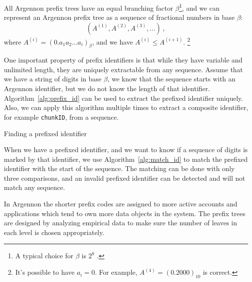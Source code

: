 All Argennon prefix trees have an equal branching factor \(\beta\)\footnote{A typical choice for \(\beta\) is \(2^8\)
    .}, and
we can represent an Argennon
prefix tree as a sequence of fractional numbers in base \(\beta\):
\[
    (A^{(1)},A^{(2)},A^{(3)},\dots)\ ,
\]
where \(A^{(i)}=(0.a_{1}a_{2}\dots a_{i})_\beta\), and we have \(A^{(i)} \leq A^{(i+1)}\). \footnote{It's possible to
have \(a_i=0\). For example, \(A^{(4)}=(0.2000)_{10}\) is correct.}

One important property of prefix identifiers is that while they have variable and unlimited length, they are
uniquely extractable from any sequence. Assume that we have a string of digits in base $\beta$, we
know that the sequence starts with an Argennon identifier, but we do not know the length of that identifier.
Algorithm~\ref{alg:prefix_id} can be used to extract the prefixed identifier uniquely. Also, we can apply this algorithm
multiple times to extract a composite identifier, for example \texttt{chunkID}, from a sequence.

\begin{algorithm}[t]
    \DontPrintSemicolon
    \BlankLine
    \BlankLine
    {
        {
            \;
        }
    }
    \;
    \caption{Finding a prefixed identifier}\label{alg:prefix_id}
\end{algorithm}

When we have a prefixed identifier, and we want to know if a sequence of digits is marked by that identifier,
we use Algorithm~\ref{alg:match_id} to match the prefixed identifier with the start of the sequence. The matching
can be done with only three comparisons, and an invalid prefixed identifier can be detected and will not match
any sequence.

In Argennon the shorter prefix codes are assigned to more active accounts and applications which tend to own more
data objects in the system. The prefix trees are designed by analyzing empirical data to make sure the number
of leaves in each level is chosen appropriately.

